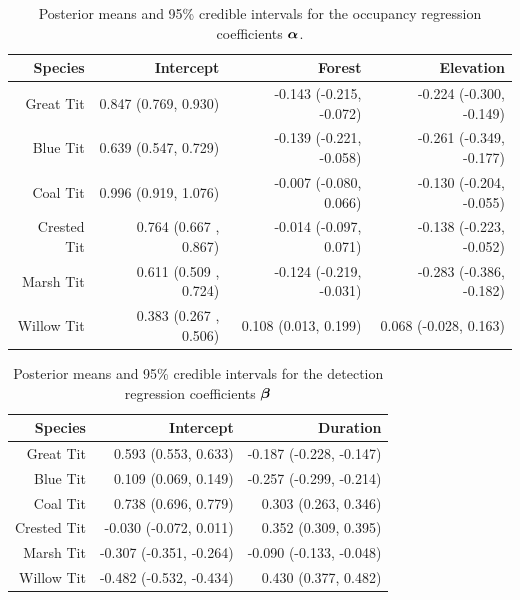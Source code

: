 \begin{table}[ht]
\centering
\begin{tabular}{rrrr}
  \hline
 Species & Intercept & Forest &  Elevation  \\ 
  \hline
Great Tit &  0.847 (0.769, 0.930) & -0.143 (-0.215, -0.072) & -0.224 (-0.300, -0.149) \\
Blue Tit  &  0.639 (0.547, 0.729) & -0.139 (-0.221, -0.058) & -0.261 (-0.349, -0.177) \\
Coal Tit  &  0.996 (0.919, 1.076) & -0.007 (-0.080,  0.066) & -0.130 (-0.204, -0.055) \\
Crested Tit & 0.764 (0.667 , 0.867) & -0.014 (-0.097,  0.071) & -0.138 (-0.223, -0.052) \\
Marsh Tit &  0.611 (0.509 , 0.724) & -0.124 (-0.219, -0.031) & -0.283 (-0.386, -0.182) \\
Willow Tit & 0.383 (0.267 , 0.506) &  0.108 (0.013,  0.199) &  0.068 (-0.028, 0.163) \\
   \hline
\end{tabular}
\caption{Posterior means and 95\% credible intervals for the occupancy regression coefficients $\mbox{\boldmath $\alpha$}$.}
\label{tab:occ}
\end{table}

\begin{table}[ht]
\centering
\begin{tabular}{rrr}
  \hline
Species & Intercept & Duration  \\ 
  \hline
Great Tit  &  0.593 (0.553, 0.633) & -0.187 (-0.228, -0.147) \\
Blue Tit &     0.109 (0.069, 0.149) & -0.257 (-0.299, -0.214) \\
Coal Tit  &   0.738 (0.696, 0.779) &  0.303 (0.263, 0.346) \\
Crested Tit & -0.030 (-0.072, 0.011) &  0.352 (0.309, 0.395) \\
Marsh Tit &  -0.307 (-0.351, -0.264) & -0.090 (-0.133, -0.048) \\
Willow Tit & -0.482 (-0.532, -0.434) &  0.430 (0.377, 0.482) \\
   \hline
\end{tabular}
\caption{Posterior means and 95\% credible intervals for the detection regression coefficients $\mbox{\boldmath $\beta$}$}
\label{tab:det}
\end{table}

